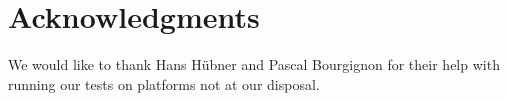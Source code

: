 \section{Acknowledgments} 

We would like to thank Hans Hübner and Pascal Bourgignon for their
help with running our tests on platforms not at our disposal.

